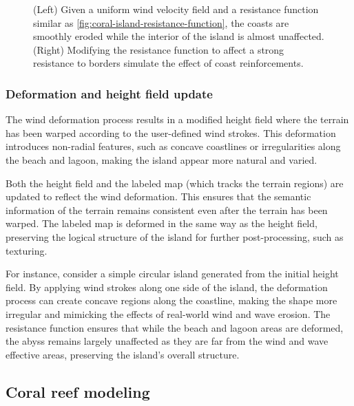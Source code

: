 \begin{figure}[H]
    \caption{(Left) Given a uniform wind velocity field and a resistance function similar as \cref{fig:coral-island-resistance-function}, the coasts are smoothly eroded while the interior of the island is almost unaffected. (Right) Modifying the resistance function to affect a strong resistance to borders simulate the effect of coast reinforcements.}
\end{figure}

\subsubsection{Deformation and height field update}

The wind deformation process results in a modified height field where the terrain has been warped according to the user-defined wind strokes. This deformation introduces non-radial features, such as concave coastlines or irregularities along the beach and lagoon, making the island appear more natural and varied.

Both the height field and the labeled map (which tracks the terrain regions) are updated to reflect the wind deformation. This ensures that the semantic information of the terrain remains consistent even after the terrain has been warped. The labeled map is deformed in the same way as the height field, preserving the logical structure of the island for further post-processing, such as texturing.

For instance, consider a simple circular island generated from the initial height field. By applying wind strokes along one side of the island, the deformation process can create concave regions along the coastline, making the shape more irregular and mimicking the effects of real-world wind and wave erosion. The resistance function ensures that while the beach and lagoon areas are deformed, the abyss remains largely unaffected as they are far from the wind and wave effective areas, preserving the island's overall structure.




\subsection{Coral reef modeling}


